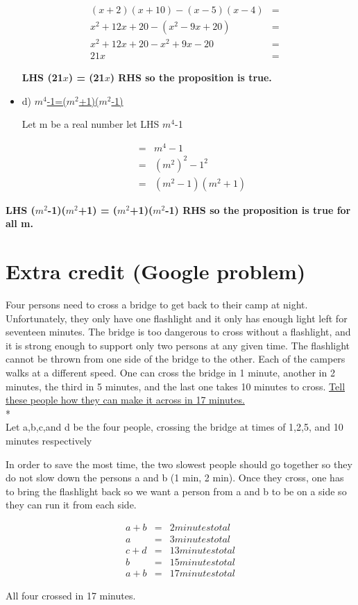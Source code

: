 \documentclass[11pt]{article}
\begin{document}
\begin{itemize}
	\begin{eqnarray*}
	(x+2)(x+10)-(x-5)(x-4)&=&\\
	x^2+12x+20-(x^2-9x+20)&=&\\
	x^2+12x+20-x^2+9x-20&=&\\
	21x&=&
	\end{eqnarray*}
	
	\textbf {LHS (21$x$) = (21$x$) RHS so the proposition is true.}
	
	\newpage
	\item[] d)
	\underline{$m^4$-1=($m^2$+1)($m^2$-1)}

	Let m be a real number
	let LHS $m^4$-1
	
	\begin{eqnarray*}
	&=& m^4-1\\
	&=& (m^2)^2-1^2\\
	&=&(m^2-1)(m^2+1)
	\end{eqnarray*}
	\end{itemize}
	\textbf {LHS ($m^2$-1)($m^2$+1) = ($m^2$+1)($m^2$-1) RHS so the proposition is true for all m.}
	\section*{Extra credit (Google problem)} 
	Four persons need to cross a bridge to get back to their camp at night. Unfortunately, they only have one flashlight and it only has enough light left for seventeen minutes. The bridge is too dangerous to cross without a flashlight, and it is strong enough to support only two persons at any given time. The flashlight cannot be thrown from one side of the bridge to the other. Each of the campers walks at a different speed. One can cross the bridge in 1 minute, another in 2 minutes, the third in 5 minutes, and the last one takes 10 minutes to cross. \underline{Tell these people how they can make it across in 17 minutes.}\\*\\
	
	Let a,b,c,and d be the four people, crossing the bridge at times of 1,2,5, and 10 minutes respectively 

	In order to save the most time, the two slowest people should go together so they do not slow down the persons a and b (1 min, 2 min). Once they cross, one has to bring the flashlight back so we want a person from a and b to be on a side so they can run it from each side. 
 

	\begin{eqnarray*}
	a+b &=& 2 minutes total\\
	a  &=& 3 minutes total\\
	c+d &=& 13 minutes total\\
	b &=& 15 minutes total\\
	a+b &=& 17 minutes total
	\end{eqnarray*}
	
	All four crossed in 17 minutes.
	

	
\end{document}
